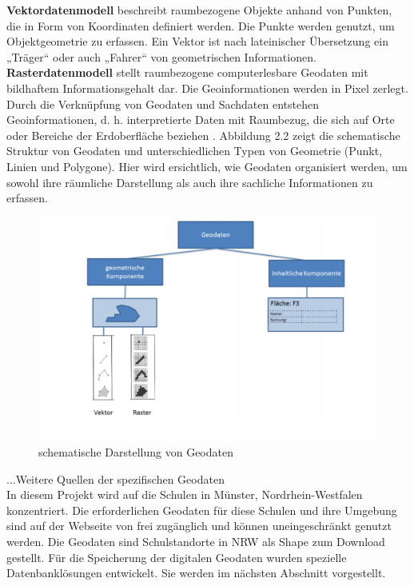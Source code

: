 \textbf{Vektordatenmodell} beschreibt raumbezogene Objekte anhand von Punkten, die in Form von Koordinaten definiert werden. Die Punkte werden genutzt, um Objektgeometrie zu erfassen. Ein Vektor ist nach lateinischer Übersetzung ein „Träger“ oder auch „Fahrer“ von geometrischen Informationen. \textbf{Rasterdatenmodell} stellt raumbezogene computerlesbare Geodaten mit bildhaftem Informationsgehalt dar. Die Geoinformationen werden in Pixel zerlegt. Durch die Verknüpfung von Geodaten und Sachdaten entstehen Geoinformationen, d. h. interpretierte Daten mit Raumbezug, die sich auf Orte oder Bereiche der Erdoberfläche beziehen \citep{klaus_geomatik_2023}. Abbildung 2.2 zeigt die schematische Struktur von Geodaten und unterschiedlichen Typen von Geometrie (Punkt, Linien und Polygone). Hier wird ersichtlich, wie Geodaten organisiert werden, um sowohl ihre räumliche Darstellung als auch ihre sachliche Informationen zu erfassen.\\

\begin{figure}[ht]
  \centering
  \includegraphics[width=\linewidth]{images/geodaten.jpeg}
  \caption{schematische Darstellung von Geodaten \citep{masterarbeit_fischer}}
  \label{fig:meineabbildung}
\end{figure}

...Weitere Quellen der spezifischen Geodaten\\

In diesem Projekt wird auf die Schulen in Münster, Nordrhein-Westfalen konzentriert. Die erforderlichen Geodaten für diese Schulen und ihre Umgebung sind auf der Webseite von \cite{schulen_geodaten} frei zugänglich und können uneingeschränkt genutzt werden. Die Geodaten sind Schulstandorte in NRW als Shape zum Download gestellt. Für die Speicherung der digitalen Geodaten wurden spezielle Datenbanklösungen entwickelt. Sie werden im nächsten Abschnitt vorgestellt.





